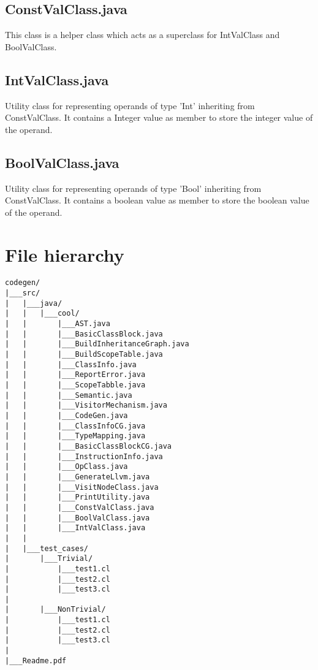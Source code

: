 \documentclass{article}
\begin{document}
\subsection{ConstValClass.java} 
This class is a helper class which acts as a superclass for IntValClass and BoolValClass.


\subsection{IntValClass.java}
Utility class for representing operands of type 'Int' inheriting from ConstValClass. It contains a Integer value as member to store the integer value of the operand.


\subsection{BoolValClass.java}
Utility class for representing operands of type 'Bool' inheriting from ConstValClass. It contains a boolean value as member to store the boolean value of the operand.


\section{File hierarchy}
\begin{lstlisting}
codegen/
|___src/
|   |___java/
|   |   |___cool/
|   |       |___AST.java
|   |       |___BasicClassBlock.java
|   |       |___BuildInheritanceGraph.java
|   |       |___BuildScopeTable.java
|   |       |___ClassInfo.java
|   |       |___ReportError.java
|   |       |___ScopeTabble.java
|   |       |___Semantic.java
|   |       |___VisitorMechanism.java
|   |       |___CodeGen.java
|   |       |___ClassInfoCG.java
|   |       |___TypeMapping.java
|   |       |___BasicClassBlockCG.java
|   |       |___InstructionInfo.java
|   |       |___OpClass.java
|   |       |___GenerateLlvm.java
|   |       |___VisitNodeClass.java
|   |       |___PrintUtility.java
|   |       |___ConstValClass.java
|   |       |___BoolValClass.java
|   |       |___IntValClass.java
|   |
|   |___test_cases/
|       |___Trivial/
|           |___test1.cl
|           |___test2.cl
|           |___test3.cl
|
|       |___NonTrivial/
|           |___test1.cl
|           |___test2.cl
|           |___test3.cl
|
|___Readme.pdf
\end{lstlisting}
\\
\end{document}
